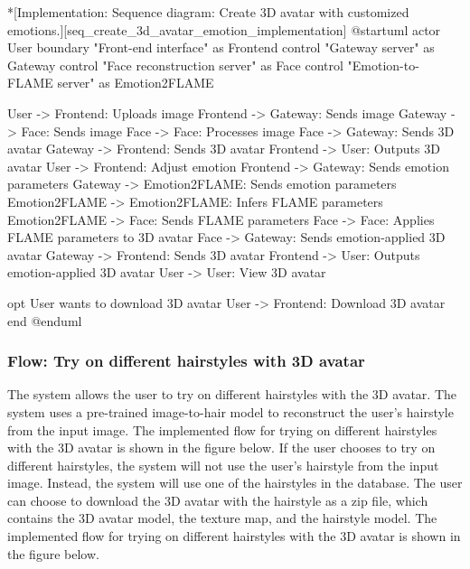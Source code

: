 \begin{umlfigure}*[Implementation: Sequence diagram: Create 3D avatar with customized emotions.][seq_create_3d_avatar_emotion_implementation]
    @startuml
    actor User
    boundary "Front-end interface" as Frontend
    control "Gateway server" as Gateway
    control "Face reconstruction server" as Face
    control "Emotion-to-FLAME server" as Emotion2FLAME

    User -> Frontend: Uploads image
    Frontend -> Gateway: Sends image
    Gateway -> Face: Sends image
    Face -> Face: Processes image
    Face -> Gateway: Sends 3D avatar
    Gateway -> Frontend: Sends 3D avatar
    Frontend -> User: Outputs 3D avatar
    User -> Frontend: Adjust emotion
    Frontend -> Gateway: Sends emotion parameters
    Gateway -> Emotion2FLAME: Sends emotion parameters
    Emotion2FLAME -> Emotion2FLAME: Infers FLAME parameters
    Emotion2FLAME -> Face: Sends FLAME parameters
    Face -> Face: Applies FLAME parameters to 3D avatar
    Face -> Gateway: Sends emotion-applied 3D avatar
    Gateway -> Frontend: Sends 3D avatar
    Frontend -> User: Outputs emotion-applied 3D avatar
    User -> User: View 3D avatar

    opt User wants to download 3D avatar
    User -> Frontend: Download 3D avatar
    end
    @enduml
\end{umlfigure}

\clearpage



\subsubsection{Flow: Try on different hairstyles with 3D avatar}

The system allows the user to try on different hairstyles with the 3D avatar. The system uses a pre-trained image-to-hair model to reconstruct the user's hairstyle from the input image. The implemented flow for trying on different hairstyles with the 3D avatar is shown in the figure below. If the user chooses to try on different hairstyles, the system will not use the user's hairstyle from the input image. Instead, the system will use one of the hairstyles in the database. The user can choose to download the 3D avatar with the hairstyle as a zip file, which contains the 3D avatar model, the texture map, and the hairstyle model. The implemented flow for trying on different hairstyles with the 3D avatar is shown in the figure below.

